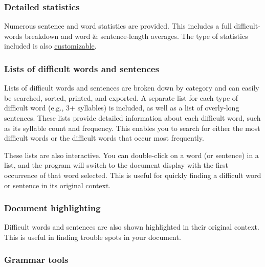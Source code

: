 \documentclass[
]{book}
\theoremstyle{definition}
\theoremstyle{definition}
\theoremstyle{definition}
\theoremstyle{definition}
\theoremstyle{remark}
\begin{document}
\hypertarget{detailed-statistics}{%
\subsubsection*{Detailed statistics}\label{detailed-statistics}}

Numerous sentence and word statistics are provided. This includes a full difficult-words breakdown and word \& sentence-length averages. The type of statistics included is also \protect\hyperlink{options-statistics}{customizable}.

\hypertarget{lists-of-difficult-words-and-sentences}{%
\subsubsection*{Lists of difficult words and sentences}\label{lists-of-difficult-words-and-sentences}}

Lists of difficult words and sentences are broken down by category and can easily be searched, sorted, printed, and exported. A separate list for each type of difficult word (e.g., 3+ syllables) is included, as well as a list of overly-long sentences. These lists provide detailed information about each difficult word, such as its syllable count and frequency. This enables you to search for either the most difficult words or the difficult words that occur most frequently.

These lists are also interactive. You can double-click on a word (or sentence) in a list, and the program will switch to the document display with the first occurrence of that word selected. This is useful for quickly finding a difficult word or sentence in its original context.

\hypertarget{document-highlighting}{%
\subsubsection*{Document highlighting}\label{document-highlighting}}

Difficult words and sentences are also shown highlighted in their original context. This is useful in finding trouble spots in your document.

\hypertarget{grammar-tools}{%
\subsubsection*{Grammar tools}\label{grammar-tools}}
\end{document}
